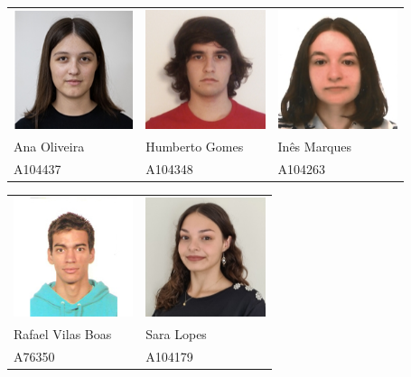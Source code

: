 \documentclass[12pt, a4paper]{article}
\begin{document}
\begin{center}
    \begin{tabular}{>{\centering}p{}
                    >{\centering}p{}
                    >{\centering\arraybackslash}p{}}
        \includegraphics[width=3.5cm]{res/cover/A104437.png} &
        \includegraphics[width=3.5cm]{res/cover/A104348.png} &
        \includegraphics[width=3.5cm]{res/cover/A104263.png}  \\

        Ana Oliveira & Humberto Gomes & Inês Marques \\
        A104437      & A104348        & A104263
    \end{tabular}

    \begin{tabular}{>{\centering}p{}
                    >{\centering\arraybackslash}p{}}
        \includegraphics[width=3.5cm]{res/cover/A76350.jpg} &
        \includegraphics[width=3.5cm]{res/cover/A104179.png} \\

        Rafael Vilas Boas & Sara Lopes \\
        A76350            & A104179
    \end{tabular}
\end{center}
\end{document}
